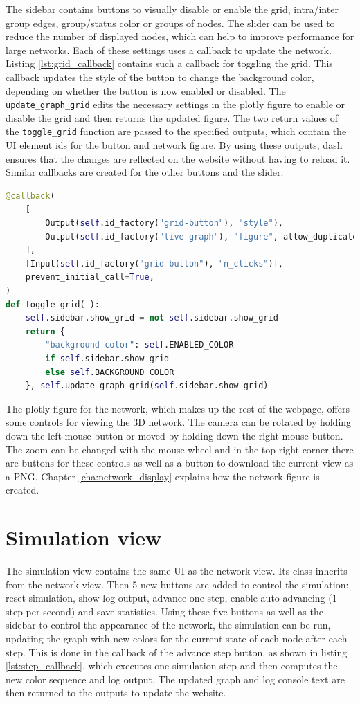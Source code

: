 The sidebar contains buttons to visually disable or enable the grid, intra/inter group edges, group/status color or groups of nodes. The slider can be used to reduce the number of displayed nodes, which can help to improve performance for large networks. Each of these settings uses a callback to update the network. Listing \ref{lst:grid_callback} contains such a callback for toggling the grid. This callback updates the style of the button to change the background color, depending on whether the button is now enabled or disabled. The \texttt{update\_graph\_grid} edits the necessary settings in the plotly figure to enable or disable the grid and then returns the updated figure. The two return values of the \texttt{toggle\_grid} function are passed to the specified outputs, which contain the UI element ids for the button and network figure. By using these outputs, dash ensures that the changes are reflected on the website without having to reload it. Similar callbacks are created for the other buttons and the slider.

\begin{lstlisting}[language=python, caption={Callback for toggling the grid}, label={lst:grid_callback}]
@callback(
    [
        Output(self.id_factory("grid-button"), "style"),
        Output(self.id_factory("live-graph"), "figure", allow_duplicate=True),
    ],
    [Input(self.id_factory("grid-button"), "n_clicks")],
    prevent_initial_call=True,
)
def toggle_grid(_):
    self.sidebar.show_grid = not self.sidebar.show_grid
    return {
        "background-color": self.ENABLED_COLOR
        if self.sidebar.show_grid
        else self.BACKGROUND_COLOR
    }, self.update_graph_grid(self.sidebar.show_grid)
\end{lstlisting}

The plotly figure for the network, which makes up the rest of the webpage, offers some controls for viewing the 3D network. The camera can be rotated by holding down the left mouse button or moved by holding down the right mouse button. The zoom can be changed with the mouse wheel and in the top right corner there are buttons for these controls as well as a button to download the current view as a PNG. Chapter \ref{cha:network_display} explains how the network figure is created.

\section{Simulation view}
The simulation view contains the same UI as the network view. Its class inherits from the network view. Then 5 new buttons are added to control the simulation: reset simulation, show log output, advance one step, enable auto advancing (1 step per second) and save statistics. Using these five buttons as well as the sidebar to control the appearance of the network, the simulation can be run, updating the graph with new colors for the current state of each node after each step. This is done in the callback of the advance step button, as shown in listing \ref{lst:step_callback}, which executes one simulation step and then computes the new color sequence and log output. The updated graph and log console text are then returned to the outputs to update the website.


